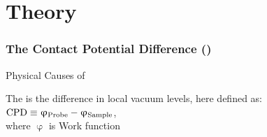 \documentclass{beamer}
\begin{document}
\section{Theory}
\begin{frame}
\frametitle{The Contact Potential Difference (\cpd{})}
\begin{block}{Physical Causes of \cpd{}}
\centering
\begin{minipage}{0.4\linewidth}
\centering
	The \cpd{} is the difference in local vacuum levels, here defined as:\\[10pt]
	$\text{CPD}{} \equiv \upvarphi _{\text{Probe}} - \upvarphi _{\text{Sample}}$, \\
	where $\upvarphi$ is Work function\\
\end{minipage}
\hfill
\begin{minipage}{0.55\linewidth}
\centering

\end{minipage}
\end{block}
\end{frame}
\end{document}
